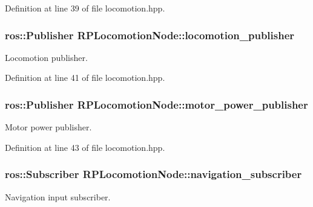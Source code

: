 \-Definition at line 39 of file locomotion.\-hpp.

\hypertarget{class_r_p_locomotion_node_a1dca36a6b277f383b193f06c52936c08}{
\subsubsection[{locomotion\-\_\-publisher}]{\setlength{\rightskip}{0pt plus 5cm}ros\-::\-Publisher {\bf \-R\-P\-Locomotion\-Node\-::locomotion\-\_\-publisher}}}\label{class_r_p_locomotion_node_a1dca36a6b277f383b193f06c52936c08}
\-Locomotion publisher. 

\-Definition at line 41 of file locomotion.\-hpp.

\hypertarget{class_r_p_locomotion_node_a89e8536163d4d7b1f2c10f27dbb16724}{
\subsubsection[{motor\-\_\-power\-\_\-publisher}]{\setlength{\rightskip}{0pt plus 5cm}ros\-::\-Publisher {\bf \-R\-P\-Locomotion\-Node\-::motor\-\_\-power\-\_\-publisher}}}\label{class_r_p_locomotion_node_a89e8536163d4d7b1f2c10f27dbb16724}
\-Motor power publisher. 

\-Definition at line 43 of file locomotion.\-hpp.

\hypertarget{class_r_p_locomotion_node_a653bdeea59dab13aa8b207ed726b055c}{
\subsubsection[{navigation\-\_\-subscriber}]{\setlength{\rightskip}{0pt plus 5cm}ros\-::\-Subscriber {\bf \-R\-P\-Locomotion\-Node\-::navigation\-\_\-subscriber}}}\label{class_r_p_locomotion_node_a653bdeea59dab13aa8b207ed726b055c}
\-Navigation input subscriber. 


